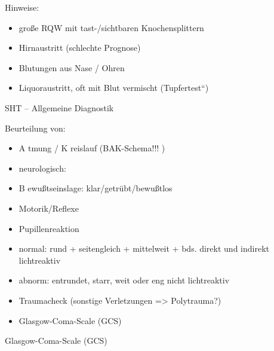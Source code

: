 \documentclass{article}
\begin{document}
{\mdseries
Hinweise:}

\begin{itemize}
\item {\mdseries
gro{\ss}e RQW mit tast-/sichtbaren  Knochensplittern}

\item {\mdseries
Hirnaustritt (schlechte Prognose)}

\item {\mdseries
Blutungen aus Nase / Ohren}

\item {\mdseries
Liquoraustritt, oft mit Blut vermischt 
({\quotedblbase}Tupfertest{\textquotedblleft})}

\end{itemize}
{\mdseries\color[rgb]{0.0,0.0,0.5019608}
SHT -- Allgemeine Diagnostik}

{\mdseries
Beurteilung von:}

\begin{itemize}
\item {\mdseries
A tmung / K reislauf  (BAK-Schema!!! )}

\item {\mdseries
neurologisch:}

\end{itemize}
\begin{itemize}
\item {\mdseries
B ewu{\ss}tseinslage: klar/getr\"ubt/bewu{\ss}tlos}

\item {\mdseries
Motorik/Reflexe}

\item {\mdseries
Pupillenreaktion }

\end{itemize}
\begin{itemize}
\item {\mdseries
normal: rund + seitengleich + mittelweit + bds.  direkt und indirekt
lichtreaktiv}

\item {\mdseries
abnorm: entrundet, starr, weit oder eng nicht  lichtreaktiv}

\end{itemize}
\begin{itemize}
\item {\mdseries
Traumacheck (sonstige Verletzungen ={\textgreater}  Polytrauma?)}

\item {\mdseries
Glasgow-Coma-Scale (GCS)}

\end{itemize}
{\mdseries\color{black}
Glasgow-Coma-Scale (GCS)}
\end{document}

